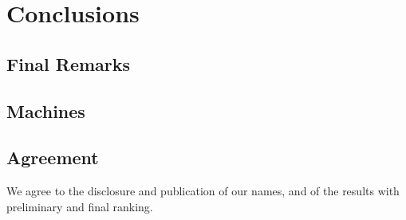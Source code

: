 \section{Conclusions}

\subsection{Final Remarks}

\paragraph{}


\subsection{Machines}


\subsection{Agreement}
We agree to the disclosure and publication of our names, and of the results with preliminary and final ranking.


